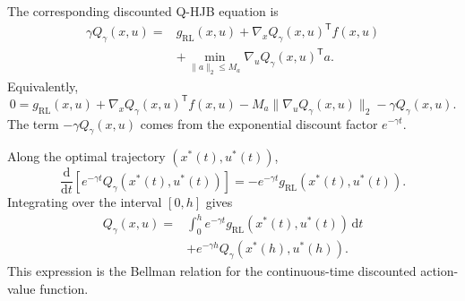 \documentclass[11pt]{article}
\begin{document}
The corresponding discounted Q-HJB equation is
\begin{equation}
\begin{split}
\gamma Q_{\gamma}(x,u)
={}&g_{\mathrm{RL}}(x,u)
+\nabla_xQ_{\gamma}(x,u)^{\mathsf T}f(x,u)\\
&+\min_{\|a\|_2\leq M_a}
\nabla_uQ_{\gamma}(x,u)^{\mathsf T}a.
\end{split}
\label{eq:discounted_QHJB}
\end{equation}
Equivalently,
\begin{equation}
0=g_{\mathrm{RL}}(x,u)
+\nabla_xQ_{\gamma}(x,u)^{\mathsf T}f(x,u)
-M_a\|\nabla_uQ_{\gamma}(x,u)\|_2
-\gamma Q_{\gamma}(x,u).
\label{eq:discounted_QHJB_simplified}
\end{equation}
The term $-\gamma Q_{\gamma}(x,u)$ comes from the exponential discount factor $e^{-\gamma t}$.

Along the optimal trajectory $(x^{*}(t),u^{*}(t))$,
\begin{equation}
\frac{\mathrm{d}}{\mathrm{d}t}
\left[
 e^{-\gamma t}Q_{\gamma}(x^{*}(t),u^{*}(t))
\right]
=-e^{-\gamma t}g_{\mathrm{RL}}(x^{*}(t),u^{*}(t)).
\label{eq:discount_derivative}
\end{equation}
Integrating over the interval $[0,h]$ gives
\begin{equation}
\begin{split}
Q_{\gamma}(x,u)
={}&\int_0^h e^{-\gamma t}
 g_{\mathrm{RL}}(x^{*}(t),u^{*}(t))\,\mathrm{d}t\\
&+e^{-\gamma h}Q_{\gamma}(x^{*}(h),u^{*}(h)).
\end{split}
\label{eq:discount_bellman_continuous}
\end{equation}
This expression is the Bellman relation for the continuous-time discounted action-value function.
\end{document}
